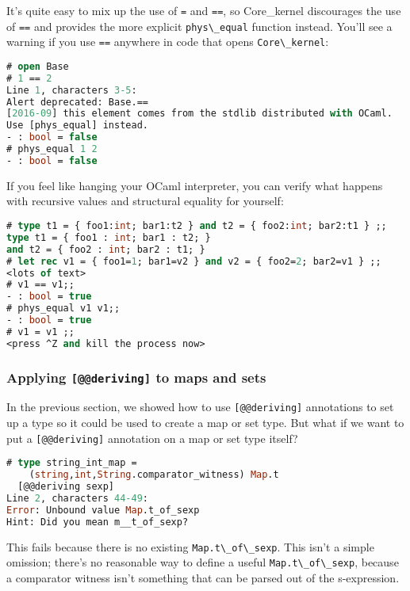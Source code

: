 It's quite easy to mix up the use of \passthrough{\lstinline!=!} and
\passthrough{\lstinline!==!}, so Core\_kernel discourages the use of
\passthrough{\lstinline!==!} and provides the more explicit
\passthrough{\lstinline!phys\_equal!} function instead. You'll see a
warning if you use \passthrough{\lstinline!==!} anywhere in code that
opens \passthrough{\lstinline!Core\_kernel!}:

\begin{lstlisting}[language=Caml]
# open Base
# 1 == 2
Line 1, characters 3-5:
Alert deprecated: Base.==
[2016-09] this element comes from the stdlib distributed with OCaml.
Use [phys_equal] instead.
- : bool = false
# phys_equal 1 2
- : bool = false
\end{lstlisting}

If you feel like hanging your OCaml interpreter, you can verify what
happens with recursive values and structural equality for yourself:

\begin{lstlisting}[language=Caml]
# type t1 = { foo1:int; bar1:t2 } and t2 = { foo2:int; bar2:t1 } ;;
type t1 = { foo1 : int; bar1 : t2; }
and t2 = { foo2 : int; bar2 : t1; }
# let rec v1 = { foo1=1; bar1=v2 } and v2 = { foo2=2; bar2=v1 } ;;
<lots of text>
# v1 == v1;;
- : bool = true
# phys_equal v1 v1;;
- : bool = true
# v1 = v1 ;;
<press ^Z and kill the process now>
\end{lstlisting}

\hypertarget{applying-deriving-to-maps-and-sets}{%
\subsubsection{\texorpdfstring{Applying \texttt{{[}@@deriving{]}} to
maps and
sets}{Applying {[}@@deriving{]} to maps and sets}}\label{applying-deriving-to-maps-and-sets}}

In the previous section, we showed how to use
\passthrough{\lstinline![@@deriving]!} annotations to set up a type so
it could be used to create a map or set type. But what if we want to put
a \passthrough{\lstinline![@@deriving]!} annotation on a map or set type
itself?

\begin{lstlisting}[language=Caml]
# type string_int_map =
    (string,int,String.comparator_witness) Map.t
  [@@deriving sexp]
Line 2, characters 44-49:
Error: Unbound value Map.t_of_sexp
Hint: Did you mean m__t_of_sexp?
\end{lstlisting}

This fails because there is no existing
\passthrough{\lstinline!Map.t\_of\_sexp!}. This isn't a simple omission;
there's no reasonable way to define a useful
\passthrough{\lstinline!Map.t\_of\_sexp!}, because a comparator witness
isn't something that can be parsed out of the s-expression.

